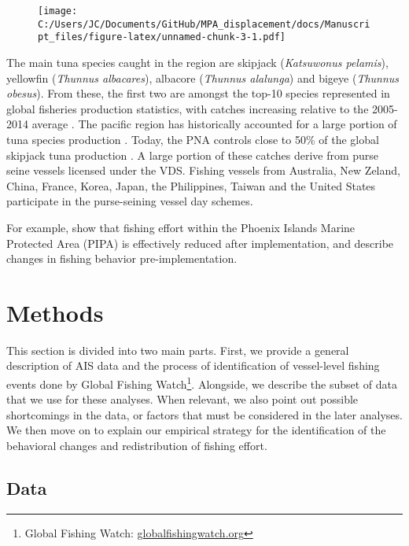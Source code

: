 \documentclass[11pt,]{article}
\let\rmarkdownfootnote\footnote%
\def\footnote{\protect\rmarkdownfootnote}
\begin{document}
\begin{figure}
\centering
\texttt{[image: C:/Users/JC/Documents/GitHub/MPA\_displacement/docs/Manuscript\_files/figure-latex/unnamed-chunk-3-1.pdf]}
\caption{\label{fig:unnamed-chunk-3}\label{fig:PNA_map}}
\end{figure}

The main tuna species caught in the region are skipjack
(\emph{Katsuwonus pelamis}), yellowfin (\emph{Thunnus albacares}),
albacore (\emph{Thunnus alalunga}) and bigeye (\emph{Thunnus obesus}).
From these, the first two are amongst the top-10 species represented in
global fisheries production statistics, with catches increasing relative
to the 2005-2014 average \citep{fao_2018}. The pacific region has
historically accounted for a large portion of tuna species production
\citep{aqorau_1997}. Today, the PNA controls close to 50\% of the global
skipjack tuna production \citep{pna_website_2018}. A large portion of
these catches derive from purse seine vessels licensed under the VDS.
Fishing vessels from Australia, New Zeland, China, France, Korea, Japan,
the Philippines, Taiwan and the United States participate in the
purse-seining vessel day schemes.

For example, \citet{mcdermott_2018} show that fishing effort within the
Phoenix Islands Marine Protected Area (PIPA) is effectively reduced
after implementation, and describe changes in fishing behavior
pre-implementation.

\hypertarget{methods}{%
\section{Methods}\label{methods}}

This section is divided into two main parts. First, we provide a general
description of AIS data and the process of identification of
vessel-level fishing events done by Global Fishing Watch\footnote{Global
  Fishing Watch: \url{globalfishingwatch.org}}. Alongside, we describe
the subset of data that we use for these analyses. When relevant, we
also point out possible shortcomings in the data, or factors that must
be considered in the later analyses. We then move on to explain our
empirical strategy for the identification of the behavioral changes and
redistribution of fishing effort.

\hypertarget{data}{%
\subsection{Data}\label{data}}
\end{document}
